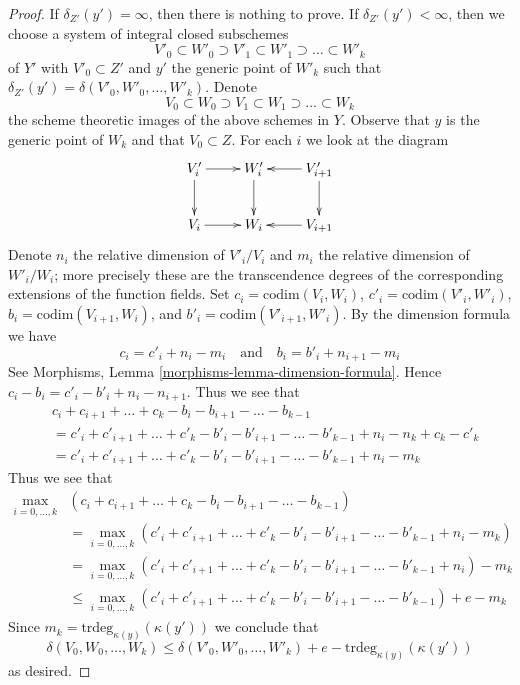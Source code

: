 \documentclass{stacks-project}
\theoremstyle{plain}
\theoremstyle{definition}
\theoremstyle{remark}
\numberwithin{equation}{subsection}
\begin{document}
\begin{proof}
If $\delta_{Z'}(y') = \infty$, then there is nothing to prove.
If $\delta_{Z'}(y') < \infty$, then we choose a system
of integral closed subschemes
$$
V'_0 \subset W'_0 \supset V'_1 \subset W'_1 \supset \ldots \subset W'_k
$$
of $Y'$ with $V'_0 \subset Z'$ and $y'$ the generic point of $W'_k$
such that $\delta_{Z'}(y') = \delta(V'_0, W'_0, \ldots, W'_k)$.
Denote
$$
V_0 \subset W_0 \supset V_1 \subset W_1 \supset \ldots \subset W_k
$$
the scheme theoretic images of the above schemes in $Y$. Observe
that $y$ is the generic point of $W_k$ and that $V_0 \subset Z$.
For each $i$ we look at the diagram
$$
\xymatrix{
V'_i \ar[r] \ar[d] & W'_i \ar[d] & V'_{i + 1} \ar[l] \ar[d] \\
V_i \ar[r] & W_i & V_{i + 1} \ar[l]
}
$$
Denote $n_i$ the relative dimension of $V'_i/V_i$ and
$m_i$ the relative dimension of $W'_i/W_i$; more precisely
these are the transcendence degrees of the corresponding extensions of
the function fields. Set
$c_i = \text{codim}(V_i, W_i)$,
$c'_i = \text{codim}(V'_i, W'_i)$,
$b_i = \text{codim}(V_{i + 1}, W_i)$, and
$b'_i = \text{codim}(V'_{i + 1}, W'_i)$.
By the dimension formula we have
$$
c_i = c'_i + n_i - m_i
\quad\text{and}\quad
b_i = b'_i + n_{i + 1} - m_i
$$
See Morphisms, Lemma \ref{morphisms-lemma-dimension-formula}.
Hence $c_i - b_i = c'_i - b'_i + n_i - n_{i + 1}$. Thus we see that
\begin{align*}
& c_i + c_{i + 1} + \ldots + c_k - b_i - b_{i + 1} - \ldots - b_{k - 1} \\
& =
c'_i + c'_{i + 1} + \ldots + c'_k - b'_i - b'_{i + 1} - \ldots - b'_{k - 1}
+ n_i - n_k + c_k - c'_k \\
& =
c'_i + c'_{i + 1} + \ldots + c'_k - b'_i - b'_{i + 1} - \ldots - b'_{k - 1}
+ n_i - m_k
\end{align*}
Thus we see that
\begin{align*}
\max_{i = 0, \ldots, k}
& (c_i + c_{i + 1} + \ldots + c_k - b_i - b_{i + 1} - \ldots - b_{k - 1}) \\
& =
\max_{i = 0, \ldots, k}
(c'_i + c'_{i + 1} + \ldots + c'_k - b'_i - b'_{i + 1} - \ldots - b'_{k - 1}
+ n_i - m_k) \\
& =
\max_{i = 0, \ldots, k}
(c'_i + c'_{i + 1} + \ldots + c'_k - b'_i - b'_{i + 1} - \ldots - b'_{k - 1}
+ n_i) - m_k \\
& \leq
\max_{i = 0, \ldots, k}
(c'_i + c'_{i + 1} + \ldots + c'_k - b'_i - b'_{i + 1} - \ldots - b'_{k - 1})
+ e - m_k
\end{align*}
Since $m_k = \text{trdeg}_{\kappa(y)}(\kappa(y'))$ we conclude that
$$
\delta(V_0, W_0, \ldots, W_k) \leq
\delta(V'_0, W'_0, \ldots, W'_k) + e - \text{trdeg}_{\kappa(y)}(\kappa(y'))
$$
as desired.
\end{proof}
\end{document}
